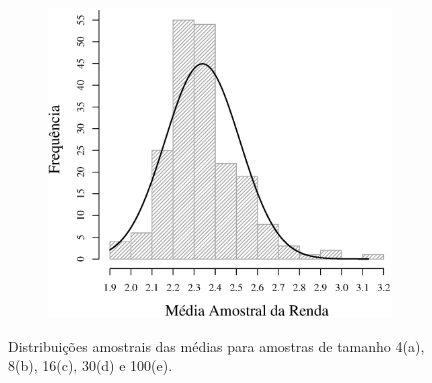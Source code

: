 \begin{figure}
\begin{subfigure}[b]{0.48\textwidth}
		\caption{}
		\label{fig:m30}
	\end{subfigure}
	\\
	\begin{subfigure}[b]{0.48\textwidth}
		\includegraphics[width=\textwidth]{plots/histogram_renda_m100.eps}
		\caption{}
		\label{fig:m100}
	\end{subfigure}
	\caption{Distribuições amostrais das médias para amostras de tamanho 4(a), 8(b), 16(c), 30(d) e 100(e).}
	\label{fig:distribuicao-amostral}
\end{figure}

\FloatBarrier
